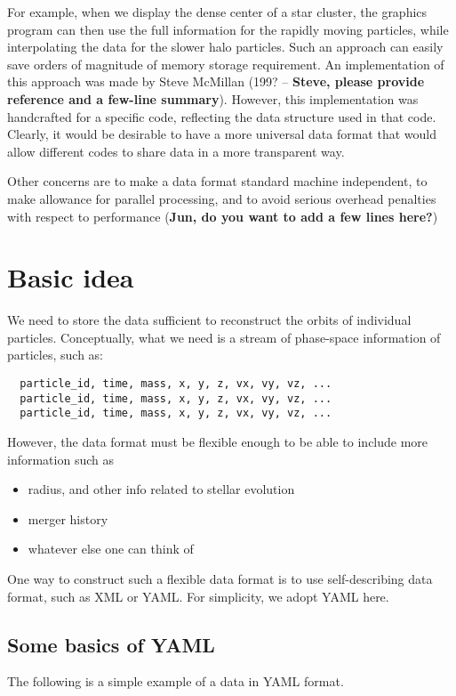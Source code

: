 \documentclass[5p,authoryear]{elsarticle}
\begin{document}
For example, when we display the dense center of a star cluster,
the graphics program can then use the full information for the rapidly
moving particles, while interpolating the data for the slower halo
particles.  Such an approach can easily save orders of magnitude of
memory storage requirement.  An implementation of this approach was
made by Steve McMillan (199? -- {\bf Steve, please provide reference
and a few-line summary}).  However, this implementation was handcrafted
for a specific code, reflecting the data structure used in that code.
Clearly, it would be desirable to have a more universal data format
that would allow different codes to share data in a more transparent
way.

Other concerns are to make a data format standard machine independent,
to make allowance for parallel processing, and to avoid serious overhead
penalties with respect to performance ({\bf Jun, do you want to add a
few lines here?})

\section{Basic idea}

We need to store the data sufficient to reconstruct the orbits of
individual particles. Conceptually, what we need is a stream of
phase-space information of particles, such as:
\begin{verbatim}
  particle_id, time, mass, x, y, z, vx, vy, vz, ...
  particle_id, time, mass, x, y, z, vx, vy, vz, ...
  particle_id, time, mass, x, y, z, vx, vy, vz, ...
\end{verbatim}
However, the data format must be flexible enough to be able to include
more information such as
\begin{itemize}
  \item radius, and other info related to stellar evolution
  \item merger history
  \item whatever else one can think of
\end{itemize}

One way to construct such a flexible data format is to use
self-describing data format, such as XML or YAML. For simplicity,
we adopt YAML here.

\subsection{Some basics of YAML}

The following is a simple example of a data in YAML format.
\end{document}
